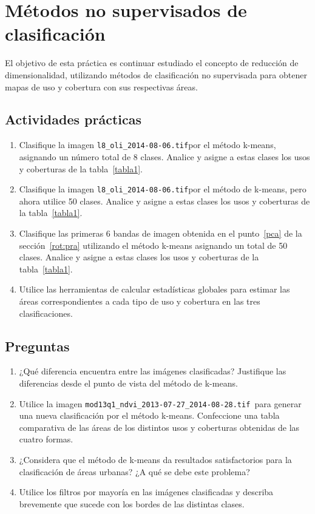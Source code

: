 \documentclass[hidelinks,12pt]{article}
\begin{document}
\section{Métodos no supervisados de clasificación}

El objetivo de esta práctica es continuar estudiado el concepto de reducción de
dimensionalidad, utilizando métodos de clasificación no supervisada para obtener
mapas de uso y cobertura con sus respectivas áreas.

\subsection{Actividades pr\'acticas}
\begin{enumerate}
    \item Clasifique la imagen \texttt{l8\_oli\_2014-08-06.tif}por el método 
        k-means, asignando un número total
        de 8 clases. Analice y asigne a estas clases los usos y coberturas de la
        tabla~\ref{tabla1}.
    \item Clasifique la imagen \texttt{l8\_oli\_2014-08-06.tif}por el método de 
        k-means, pero ahora utilice 50
        clases. Analice y asigne a estas clases los usos y coberturas de la
        tabla~\ref{tabla1}.
    \item Clasifique las primeras 6 bandas de  imagen obtenida en el punto~\ref{pca} 
        de la secci\'on~\ref{rot:pra} utilizando el m\'etodo k-means
        asignando un total de 50 clases. Analice y asigne a estas clases los 
        usos y coberturas de la tabla~\ref{tabla1}.
    \item Utilice las herramientas de calcular estadísticas globales para
        estimar las áreas correspondientes a cada tipo de uso y cobertura en
        las tres clasificaciones.
\end{enumerate}

\subsection{Preguntas}
\begin{enumerate}
    \item ¿Qué diferencia encuentra entre las imágenes clasificadas? Justifique
        las diferencias desde el punto de vista del método de k-means.
    \item Utilice la imagen  \texttt{mod13q1\_ndvi\_2013-07-27\_2014-08-28.tif }para 
        generar una nueva clasificación por el método k-means. Confeccione una 
        tabla comparativa de las áreas de los distintos usos y coberturas 
        obtenidas de las cuatro formas.
    \item ¿Considera que el método de k-means da resultados satisfactorios para
        la clasificación de áreas urbanas? ¿A qué se debe este problema?
    \item Utilice los filtros por mayoría en las imágenes clasificadas y
        describa brevemente que sucede con los bordes de las distintas clases.
\end{enumerate}
\end{document}
